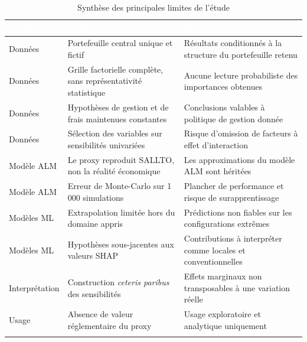 \begin{table}[htbp]
\centering
\caption{Synthèse des principales limites de l'étude}
\label{tab:synthese_limites}
\renewcommand{\arraystretch}{1.35}
\setlength{\arrayrulewidth}{0.4pt}
\begin{tabularx}{\textwidth}{>{\raggedright\arraybackslash}p{2.6cm} >{\raggedright\arraybackslash}X >{\raggedright\arraybackslash}p{4.4cm}}
\arrayrulecolor{rougeCorp}\toprule
\rowcolor{rougeCorp}
\textcolor{white}{\textbf{Origine}} & \textcolor{white}{\textbf{Limite}} & \textcolor{white}{\textbf{Portée sur les conclusions}} \\
\midrule
\rowcolor{rosePale}
Données & Portefeuille central unique et fictif & Résultats conditionnés à la structure du portefeuille retenu \\
\rowcolor{white}
Données & Grille factorielle complète, sans représentativité statistique & Aucune lecture probabiliste des importances obtenues \\
\rowcolor{rosePale}
Données & Hypothèses de gestion et de frais maintenues constantes & Conclusions valables à politique de gestion donnée \\
\rowcolor{white}
Données & Sélection des variables sur sensibilités univariées & Risque d'omission de facteurs à effet d'interaction \\
\rowcolor{rosePale}
Modèle ALM & Le proxy reproduit SALLTO, non la réalité économique & Les approximations du modèle ALM sont héritées \\
\rowcolor{white}
Modèle ALM & Erreur de Monte-Carlo sur 1\,000 simulations & Plancher de performance et risque de surapprentissage \\
\rowcolor{rosePale}
Modèles ML & Extrapolation limitée hors du domaine appris & Prédictions non fiables sur les configurations extrêmes \\
\rowcolor{white}
Modèles ML & Hypothèses sous-jacentes aux valeurs SHAP & Contributions à interpréter comme locales et conventionnelles \\
\rowcolor{rosePale}
Interprétation & Construction \emph{ceteris paribus} des sensibilités & Effets marginaux non transposables à une variation réelle \\
\rowcolor{white}
Usage & Absence de valeur réglementaire du proxy & Usage exploratoire et analytique uniquement \\
\bottomrule
\arrayrulecolor{black}
\end{tabularx}
\end{table}

